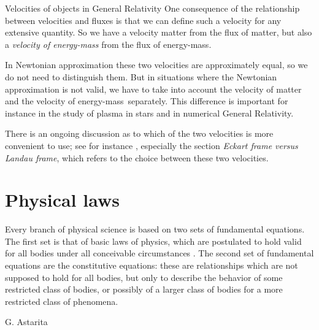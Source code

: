 \documentclass[a4paper,12pt,%
onecolumn,oneside,%
british%
]{memoir}
\newcommand*{\incr}{\Delta}%
\renewcommand*{\|}[1][]{\nonscript\:#1\vert\nonscript\:\mathopen{}}
\newcommand*{\energym}{energy-mass}
\begin{document}
\begin{extra}{Velocities of objects in General Relativity}
  One consequence of the relationship between velocities and fluxes is that we can define such a velocity for any extensive quantity. So we have a velocity matter from the flux of matter, but also a \emph{velocity of \energym} from the flux of \energym.

  \smallskip

  In Newtonian approximation these two velocities are approximately equal, so we do not need to distinguish them. But in situations where the Newtonian approximation is not valid, we have to take into account the velocity of matter and the velocity of \energym\ separately. This difference is important for instance in the study of plasma in stars and in numerical General Relativity.

  \smallskip

  There is an ongoing discussion as to which of the two velocities is more convenient to use; see for instance \cites{kandusetal2008}, especially the section \emph{Eckart frame versus Landau frame}, which refers to the choice between these two velocities.
\end{extra}



\printpagenotes*
\cleartooddpage
\chapter{Physical laws}
\label{cha:laws}


\epigraph{Every branch of physical science is based on two sets of fundamental equations. The first set is that of basic laws of physics, which are postulated to hold valid for all bodies under all conceivable circumstances \textelp{}. The second set of fundamental equations are the constitutive equations: these are relationships which are not supposed to hold for all bodies, but only to describe the behavior of some restricted class of bodies, or possibly of a larger class of bodies for a more restricted class of phenomena.}{G. Astarita \cites*{astarita1989_r1990}}
\end{document}
